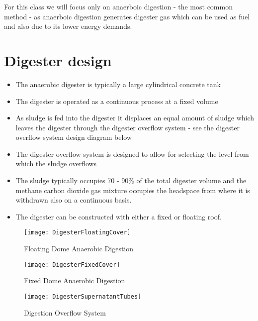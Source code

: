         For this class we will focus only on anaerboic digestion - the most common method - as anaerboic digestion generates digester gas which can be used as fuel and also due to its lower energy demands.
\newpage
\section{Digester design}
            
            \begin{itemize}
                \item The anaerobic digester is typically a large cylindrical concrete tank
                \item The digester is operated as a continuous process at a fixed volume
                \item As sludge is fed into the digester it displaces an equal amount of sludge which leaves the digester through the digester overflow system - see the digester overflow system design diagram below
                \item The digester overflow system is designed to allow for selecting the level from which the sludge overflows
                \item The sludge typically occupies 70 - 90\% of the total digester volume and the methane carbon dioxide gas mixture occupies the headspace from where it is withdrawn also on a continuous basis.
                \item The digester can be constructed with either a fixed or floating roof.
            \end{itemize}

\begin{figure}[]
	\begin{center}
		\texttt{[image: DigesterFloatingCover]}\\
			\caption{Floating Dome Anaerobic Digestion}
	\end{center}
	\end{figure}
	
	
\begin{figure}[]
	\begin{center}
		\texttt{[image: DigesterFixedCover]}\\
			\caption{Fixed Dome Anaerobic Digestion}
	\end{center}
	\end{figure}
	
	
\begin{figure}[]
	\begin{center}
		\texttt{[image: DigesterSupernatantTubes]}\\
			\caption{Digestion Overflow System}
	\end{center}
	\end{figure}


